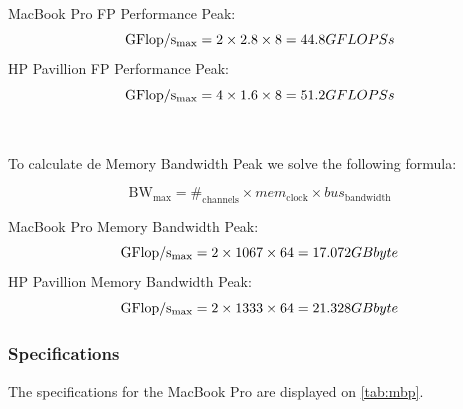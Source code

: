 \documentclass[a4paper,10pt,openright,openbib,twocolumn]{article}
\begin{document}
MacBook Pro FP Performance Peak:
$$\mathrm{GFlop/s_{max}} =  2 \times 2.8 \times 8
						 =  44.8 GFLOPS\\s$$
HP Pavillion FP Performance Peak:
$$\mathrm{GFlop/s_{max}} =  4 \times 1.6 \times 8
						 =  51.2 GFLOPS\\s$$
\\
\\
To calculate de Memory Bandwidth Peak we solve the following formula:

$$\mathrm{BW_{max}} =  \#_{\mathrm{channels}} \times mem_{\mathrm{clock}} \times bus_{\mathrm{bandwidth}}$$
 
MacBook Pro Memory Bandwidth Peak:
$$\mathrm{GFlop/s_{max}} =  2 \times 1067 \times 64
						 =  17.072 GB\\byte$$
HP Pavillion Memory Bandwidth Peak:
$$\mathrm{GFlop/s_{max}} =  2 \times 1333 \times 64
						 =  21.328 GB\\byte$$

\subsubsection{Specifications}
The specifications for the MacBook Pro are displayed on \autoref{tab:mbp}. \\
\end{document}
